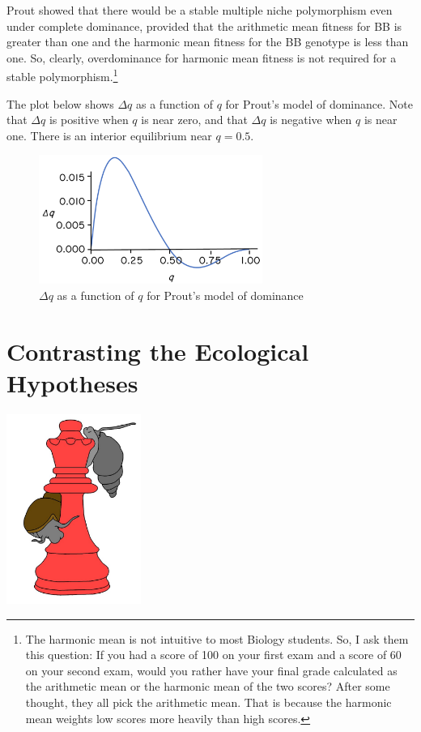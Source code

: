 \documentclass[
  letterpaper,
]{book}
\begin{document}
Prout showed that there would be a stable multiple niche polymorphism
even under complete dominance, provided that the arithmetic mean fitness
for BB is greater than one and the harmonic mean fitness for the BB
genotype is less than one. So, clearly, overdominance for harmonic mean
fitness is not required for a stable polymorphism.\footnote{The harmonic
  mean is not intuitive to most Biology students. So, I ask them this
  question: If you had a score of 100 on your first exam and a score of
  60 on your second exam, would you rather have your final grade
  calculated as the arithmetic mean or the harmonic mean of the two
  scores? After some thought, they all pick the arithmetic mean. That is
  because the harmonic mean weights low scores more heavily than high
  scores.}

The plot below shows \(\Delta q\) as a function of \(q\) for Prout's
model of dominance. Note that \(\Delta q\) is positive when \(q\) is
near zero, and that \(\Delta q\) is negative when \(q\) is near one.
There is an interior equilibrium near \(q = 0.5\).

\begin{figure}[H]

{\centering \includegraphics[width=0.65\textwidth,height=\textheight]{images/fig2-5_hr.png}

}

\caption[Prout's model of dominance]{\(\Delta q\) as a function of \(q\)
for Prout's model of dominance}

\end{figure}%


\chapter{Contrasting the Ecological Hypotheses}\label{sec-eco-hyp-cont}

\begin{center}
\includegraphics[width=0.33\textwidth,height=\textheight]{images/fig3-1.jpeg}
\end{center}
\end{document}
